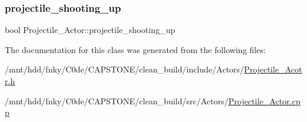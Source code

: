 \mbox{\label{classProjectile__Actor_a68a49440a92e4df0b57ad1f585db53a6}} 
\subsubsection{\texorpdfstring{projectile\+\_\+shooting\+\_\+up}{projectile\_shooting\_up}}
{\footnotesize\ttfamily bool Projectile\+\_\+\+Actor\+::projectile\+\_\+shooting\+\_\+up\hspace{0.3cm}{\ttfamily [private]}}



The documentation for this class was generated from the following files\+:\begin{DoxyCompactItemize}
\item 
/mnt/hdd/fnky/\+C0de/\+C\+A\+P\+S\+T\+O\+N\+E/clean\+\_\+build/include/\+Actors/\hyperlink{Projectile__Acotr_8h}{Projectile\+\_\+\+Acotr.\+h}\item 
/mnt/hdd/fnky/\+C0de/\+C\+A\+P\+S\+T\+O\+N\+E/clean\+\_\+build/src/\+Actors/\hyperlink{Projectile__Actor_8cpp}{Projectile\+\_\+\+Actor.\+cpp}\end{DoxyCompactItemize}
